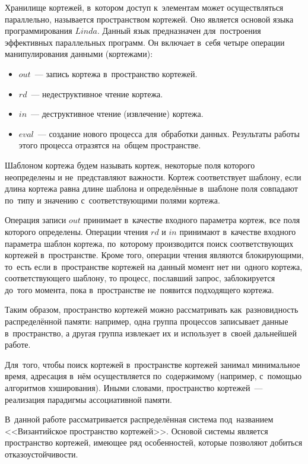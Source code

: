 Хранилище кортежей, в~котором доступ к~элементам может осуществляться параллельно, называется пространством кортежей. Оно является основой языка программирования $Linda$. Данный язык предназначен для~построения эффективных параллельных программ. Он включает в~себя четыре операции манипулирования данными (кортежами):
\begin{itemize}
	\item $out$~--- запись кортежа в~пространство кортежей.
	\item $rd$~--- недеструктивное чтение кортежа.
	\item $in$~--- деструктивное чтение (извлечение) кортежа.
	\item $eval$~--- создание нового процесса для~обработки данных. Результаты работы этого процесса отразятся на~общем пространстве.
\end{itemize}

Шаблоном кортежа будем называть кортеж, некоторые поля которого неопределены и не~представляют важности. Кортеж соответствует шаблону, если длина кортежа равна длине шаблона и определённые в~шаблоне поля совпадают по~типу и значению с~соответствующими полями кортежа.

Операция записи $out$ принимает в~качестве входного параметра кортеж, все поля которого определены. Операции чтения $rd$ и $in$ принимают в~качестве входного параметра шаблон кортежа, по~которому производится поиск соответствующих кортежей в~пространстве. Кроме того, операции чтения являются блокирующими, то~есть если в~пространстве кортежей на данный момент нет ни~одного кортежа, соответствующего шаблону, то процесс, пославший запрос, заблокируется до~того момента, пока в~пространстве не~появится подходящего кортежа.

Таким образом, пространство кортежей можно рассматривать как~разновидность распределённой памяти: например, одна группа процессов записывает данные в~пространство, а другая группа извлекает их и использует в~своей дальнейшей работе.

Для~того, чтобы поиск кортежей в~пространстве кортежей занимал минимальное время, адресация в~нём осуществляется по~содержимому (например, с~помощью алгоритмов хэширования). Иными словами, пространство кортежей~--- реализация парадигмы ассоциативной памяти.

В~данной работе рассматривается распределённая система под~названием <<Византийское пространство кортежей>>. Основой системы является пространство кортежей, имеющее ряд особенностей, которые позволяют добиться отказоустойчивости.

